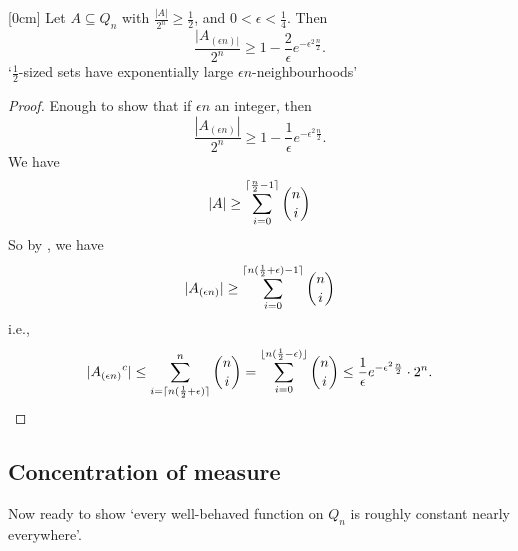 \documentclass{article}
\DeclarePairedDelimiter\ceil{\lceil}{\rceil}
\DeclarePairedDelimiter\floor{\lfloor}{\rfloor}
\newcommand{\named}[1]{\textbf{#1}\index{#1}}
\let\subset\subseteq
\begin{document}
\begin{nthm}\label{thm:2.5}
  [0cm]
  Let $A \subset Q_n$ with $\frac{|A|}{2^n} \geq \frac{1}{2}$, and $0 < \epsilon < \frac{1}{4}$.
  Then
  \begin{equation*}
    \frac{|A_{(\epsilon n)|}}{2^n} \geq 1 - \frac{2}{\epsilon} e^{-\epsilon^2 \frac{n}{2}}.
  \end{equation*}
  `$\frac{1}{2}$-sized sets have exponentially large $\epsilon n$-neighbourhoods'
\end{nthm}
\begin{proof}
  Enough to show that if $\epsilon n$ an integer, then
  \begin{equation*}
    \frac{|A_{(\epsilon n)}|}{2^n} \geq 1 - \frac{1}{\epsilon} e^{-\epsilon^2 \frac{n}{2}}.
  \end{equation*}
  We have
  \begin{equation*}
    |A| \geq \sum_{i=0}^{\ceil{\frac{n}{2} - 1}} \binom{n}{i}
  \end{equation*}
  So by , we have
  \begin{equation*}
    |A_{(\epsilon n)}| \geq \sum_{i=0}^{\ceil{n(\frac{1}{2} + \epsilon) - 1}} \binom{n}{i}
  \end{equation*}
  i.e.,
  \begin{equation*}
    |{A_{(\epsilon n)}}^c| \leq \sum_{i=\ceil{n (\frac{1}{2} + \epsilon)}}^n \binom{n}{i} = \sum_{i=0}^{\floor{n(\frac{1}{2}- \epsilon)}} \binom{n}{i} \leq \frac{1}{\epsilon} e^{-\epsilon^2 \frac{n}{2}} \cdot 2^n. \qedhere
  \end{equation*}
\end{proof}
\subsection{Concentration of measure}

Now ready to show `every well-behaved function on \hyperlink{def:qn}{$Q_n$} is roughly constant nearly everywhere'.
\end{document}

